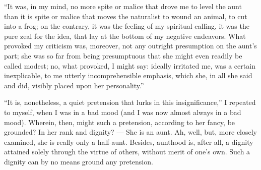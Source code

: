 \documentclass[12pt,a4paper]{book}
\begin{document}
``It was, in my mind, no more spite or malice that drove me to level the aunt than it is spite or malice that moves the naturalist to wound an animal, to cut into a frog; on the contrary, it was the feeling of my spiritual calling, it was the pure zeal for the idea, that lay at the bottom of my negative endeavors. What provoked my criticism was, moreover, not any outright presumption on the aunt's part; she was so far from being presumptuous that she might even readily be called modest; no, what provoked, I might say: ideally irritated me, was a certain inexplicable, to me utterly incomprehensible emphasis, which she, in all she said and did, visibly placed upon her personality.''

``It is, nonetheless, a quiet pretension that lurks in this insignificance,'' I repeated to myself, when I was in a bad mood (and I was now almost always in a bad mood). Wherein, then, might such a pretension, according to her fancy, be grounded? In her rank and dignity? --- She is an aunt. Ah, well, but, more closely examined, she is really only a half-aunt. Besides, aunthood is, after all, a dignity attained solely through the virtue of others, without merit of one's own. Such a dignity can by no means ground any pretension.
\end{document}
